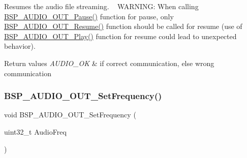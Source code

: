 Resumes the audio file streaming. ~\newline
W\+A\+R\+N\+I\+NG\+: When calling \mbox{\hyperlink{group___s_t_m32_f4___d_i_s_c_o_v_e_r_y___a_u_d_i_o___o_u_t___private___functions_ga73a0f92b8adbfb2e8207067434c2bfef}{B\+S\+P\+\_\+\+A\+U\+D\+I\+O\+\_\+\+O\+U\+T\+\_\+\+Pause()}} function for pause, only \mbox{\hyperlink{group___s_t_m32_f4___d_i_s_c_o_v_e_r_y___a_u_d_i_o___o_u_t___private___functions_ga064f0eddd4ab25a33fd1fe83af429c9f}{B\+S\+P\+\_\+\+A\+U\+D\+I\+O\+\_\+\+O\+U\+T\+\_\+\+Resume()}} function should be called for resume (use of \mbox{\hyperlink{group___s_t_m32_f4___d_i_s_c_o_v_e_r_y___a_u_d_i_o___o_u_t___private___functions_gaa415fdd481a01468fdfcd9d91f0f6711}{B\+S\+P\+\_\+\+A\+U\+D\+I\+O\+\_\+\+O\+U\+T\+\_\+\+Play()}} function for resume could lead to unexpected behavior). 


\begin{DoxyRetVals}{Return values}
{\em A\+U\+D\+I\+O\+\_\+\+OK} & if correct communication, else wrong communication \\
\hline
\end{DoxyRetVals}
\mbox{\label{group___s_t_m32_f4___d_i_s_c_o_v_e_r_y___a_u_d_i_o___o_u_t___private___functions_gaf9159656c0f4dde08c62334a25d4b106}} 
\subsubsection{\texorpdfstring{B\+S\+P\+\_\+\+A\+U\+D\+I\+O\+\_\+\+O\+U\+T\+\_\+\+Set\+Frequency()}{BSP\_AUDIO\_OUT\_SetFrequency()}}
{\footnotesize\ttfamily void B\+S\+P\+\_\+\+A\+U\+D\+I\+O\+\_\+\+O\+U\+T\+\_\+\+Set\+Frequency (\begin{DoxyParamCaption}\item[{uint32\+\_\+t}]{Audio\+Freq }\end{DoxyParamCaption})}



